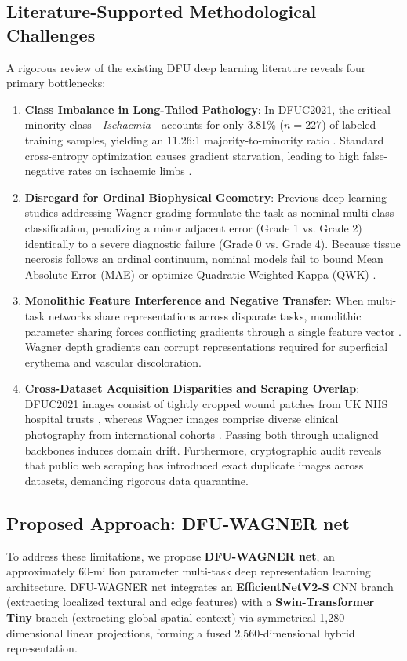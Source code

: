 \documentclass[journal]{IEEEtran}
\begin{document}
\subsection{Literature-Supported Methodological Challenges}
A rigorous review of the existing DFU deep learning literature reveals four primary bottlenecks:
\begin{enumerate}
    \item \textbf{Class Imbalance in Long-Tailed Pathology}: In DFUC2021, the critical minority class---\textit{Ischaemia}---accounts for only 3.81\% ($n = 227$) of labeled training samples, yielding an 11.26:1 majority-to-minority ratio \cite{cassidy2021diabetic}. Standard cross-entropy optimization causes gradient starvation, leading to high false-negative rates on ischaemic limbs \cite{toofanee2023dfu, galdran2021convolutional}.
    \item \textbf{Disregard for Ordinal Biophysical Geometry}: Previous deep learning studies addressing Wagner grading \cite{rostami2024deep, zhou2025deep} formulate the task as nominal multi-class classification, penalizing a minor adjacent error (Grade 1 vs. Grade 2) identically to a severe diagnostic failure (Grade 0 vs. Grade 4). Because tissue necrosis follows an ordinal continuum, nominal models fail to bound Mean Absolute Error (MAE) or optimize Quadratic Weighted Kappa (QWK) \cite{cao2020rank, cohen1968weighted}.
    \item \textbf{Monolithic Feature Interference and Negative Transfer}: When multi-task networks share representations across disparate tasks, monolithic parameter sharing forces conflicting gradients through a single feature vector \cite{caruana1997multitask, bousmalis2016domain}. Wagner depth gradients can corrupt representations required for superficial erythema and vascular discoloration.
    \item \textbf{Cross-Dataset Acquisition Disparities and Scraping Overlap}: DFUC2021 images consist of tightly cropped wound patches from UK NHS hospital trusts \cite{cassidy2021diabetic}, whereas Wagner images comprise diverse clinical photography from international cohorts \cite{rostami2024deep}. Passing both through unaligned backbones induces domain drift. Furthermore, cryptographic audit reveals that public web scraping has introduced exact duplicate images across datasets, demanding rigorous data quarantine.
\end{enumerate}

\subsection{Proposed Approach: DFU-WAGNER net}
To address these limitations, we propose \textbf{DFU-WAGNER net}, an approximately 60-million parameter multi-task deep representation learning architecture. DFU-WAGNER net integrates an \textbf{EfficientNetV2-S} CNN branch (extracting localized textural and edge features) with a \textbf{Swin-Transformer Tiny} branch (extracting global spatial context) via symmetrical 1,280-dimensional linear projections, forming a fused 2,560-dimensional hybrid representation.
\end{document}
